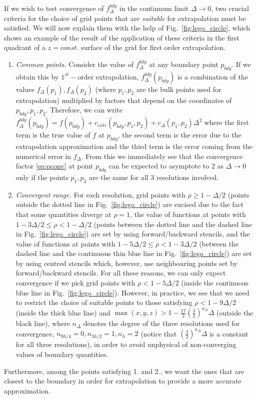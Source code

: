 \documentclass[a4paper,11pt]{article}
\numberwithin{equation}{section}
\begin{document}
If we wish to test convergence of $f^{bdy}_{\Delta}$ in the continuum limit $\Delta\rightarrow0$, two crucial criteria for the choice of grid points that are \emph{suitable} for extrapolation must be satisfied. We will now explain them with the help of Fig.~\ref{fig:lego_circle}, which shows an example of the result of the application of these criteria in the first quadrant of a $z=const.$ surface of the grid for first order extrapolation.
\begin{enumerate}
 \item \emph{Common points.} Consider the value of $f^{bdy}_{\Delta}$ at any boundary point $p_{bdy}$. If we obtain this by $1^{st}-$order extrapolation, $f^{bdy}_{\Delta}(p_{bdy})$ is a combination of the values $f_\Delta(p_1),f_\Delta(p_2)$ (where $p_1,p_2$ are the bulk points used for extrapolation) multiplied by factors that depend on the coordinates of $p_{bdy},p_1,p_2$. Therefore, we can write  $f^{bdy}_{\Delta}(p_{bdy})=f(p_{bdy})+c_{extr}(p_{bdy},p_1,p_2)+c_\Delta(p_1,p_2)\Delta^2$ where the first term is the true value of $f$ at $p_{bdy}$, the second term is the error due to the extrapolation approximation and the third term is the error coming from the numerical error in $f_\Delta$. From this we immediately see that the convergence factor \eqref{eq:qconv} at point $p_{bdy}$ can be expected to asymptote to 2 as $\Delta\rightarrow0$ only if the points $p_1,p_2$ are the same for all 3 resolutions involved.
 
\item \emph{Convergent range.} For each resolution, grid points with $\rho\geq 1-\Delta/2$ (points outside the dotted line in Fig.~\ref{fig:lego_circle}) are excised due to the fact that some quantities diverge at $\rho=1$, the value of functions at points with $1-3\Delta/2\leq \rho < 1-\Delta/2$ (points between the dotted line and the dashed line in Fig.~\ref{fig:lego_circle}) are set by using forward/backward stencils, and the value of functions at points with $1-5\Delta/2\leq \rho < 1-3\Delta/2$ (between the dashed line and the continuous thin blue line in Fig.~\ref{fig:lego_circle}) are set by using centred stencils which, however, use neighbouring points set by forward/backward stencils. For all these reasons, we can only expect convergence if we pick grid points with  $\rho<1-5\Delta/2$ (inside the continuous blue line in Fig.~\ref{fig:lego_circle}). However, in practice, we see that we need to restrict the choice of suitable points to those satisfying $\rho<1-9\Delta/2$ (inside the thick blue line) and $\max(x,y,z)>1-\frac{17}{2}\left(\frac{3}{2}\right)^{n_\Delta}\Delta$ (outside the black line), where $n_\Delta$ denotes the degree of the three resolutions used for convergence, $n_{9h/4}=0,n_{3h/2}=1,n_{h}=2$ (notice that $\left(\frac{3}{2}\right)^{n_\Delta}\Delta$ is a constant for all three resolutions), in order to avoid unphysical of non-converging values of boundary quantities.
 \end{enumerate}
Furthermore, among the points satisfying 1. and 2., we want the ones that are closest to the boundary in order for extrapolation to provide a more accurate approximation.
\end{document}
